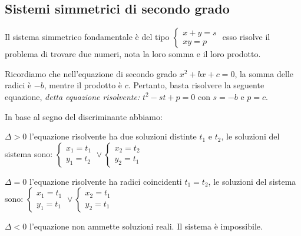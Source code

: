 \subsection{Sistemi simmetrici di secondo grado}
Il sistema simmetrico fondamentale è del tipo 
\(\left\{\begin{array}{l}{x+y=s}\\{xy=p}\end{array}\right.\) esso risolve il 
problema di trovare due numeri, nota la loro somma e il loro prodotto.

Ricordiamo che nell'equazione di secondo grado \(x^2+bx+c=0\), la somma delle 
radici è \(-b\), mentre il prodotto è \(c\). Pertanto, basta risolvere la seguente 
equazione, \emph{detta equazione risolvente: } \(t^2-st+p=0\) con \(s=-b\) e \(p=c\).

In base al segno del discriminante abbiamo:
\begin{itemize*}
\item \(\Delta >0\) l'equazione risolvente ha due soluzioni distinte \( t_1 \) e \( 
t_2 \), le soluzioni del sistema sono: 
\(\left\{\begin{array}{l}{x_1=t_1}\\{y_1=t_2}\end{array}\right.\vee 
\left\{\begin{array}{l}{x_2=t_2}\\{y_2=t_1}\end{array}\right.\)
\item \(\Delta =0\) l'equazione risolvente ha radici coincidenti \(t_1=t_2\), le 
soluzioni del sistema sono: 
\(\left\{\begin{array}{l}{x_1=t_1}\\{y_1=t_1}\end{array}\right.\vee 
\left\{\begin{array}{l}{x_2=t_1}\\{y_2=t_1}\end{array}\right.\)
\item \(\Delta <0\) l'equazione non ammette soluzioni reali. Il sistema è 
impossibile.
\end{itemize*}

